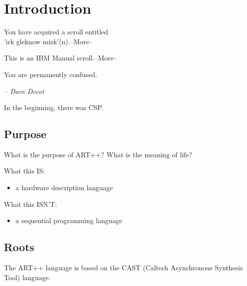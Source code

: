 
\chapter{Introduction}
\label{sec:intro}

\begin{flushright}
{ \ttfamily
You have acquired a scroll entitled\\
'irk gleknow mizk'(n).--More--

\medskip
This is an IBM Manual scroll.--More--

\medskip
You are permanently confused.

\bigskip
}	%
{\itshape -- Dave Decot}
\end{flushright}


In the beginning, there was CSP\cite{ref:csp}.


\section{Purpose}
\label{sec:intro:purpose}

What is the purpose of ART++?
What is the meaning of life?

What this IS:
\begin{itemize}
\item a hardware description language
\end{itemize}

What this ISN'T:
\begin{itemize}
\item a sequential programming language
\end{itemize}

\section{Roots}
\label{sec:intro:roots}

The ART++ language is based on the CAST
(Caltech Asynchronous Synthesis Tool) language.  

